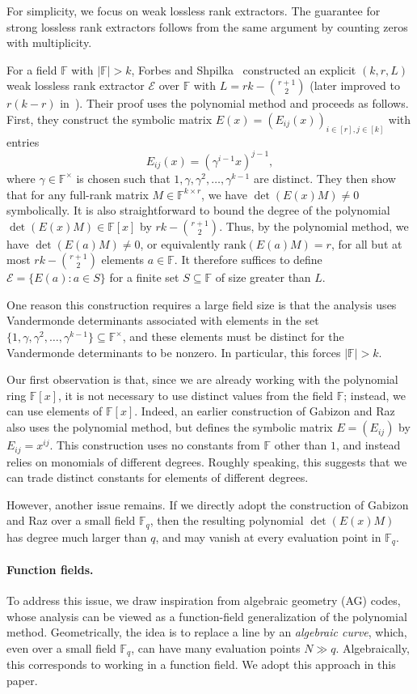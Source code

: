 \documentclass[11pt]{article}
\newcommand{\rank}{\mathrm{rank}}
\newcommand{\F}{\mathbb{F}}
\begin{document}
For simplicity, we focus on weak lossless rank extractors. The guarantee for strong lossless rank extractors follows from the same argument by counting zeros with multiplicity.

For a field $\F$ with $|\F|>k$, Forbes and Shpilka~\cite{FS12} constructed an explicit $(k,r,L)$ weak lossless rank extractor $\mathcal{E}$ over $\F$ with $L=rk-\binom{r+1}{2}$ (later improved to $r(k-r)$ in~\cite{FSS14,For14}). Their proof uses the polynomial method and proceeds as follows. First, they construct the symbolic matrix $E(x)=(E_{ij}(x))_{i\in [r], j\in [k]}$ with entries
\[
E_{ij}(x)=(\gamma^{i-1}x)^{j-1},
\]
where $\gamma\in\F^\times$ is chosen such that $1,\gamma,\gamma^2,\dots,\gamma^{k-1}$ are distinct. They then show that for any full-rank matrix $M\in \F^{k\times r}$, we have $\det(E(x)M)\neq 0$ symbolically. It is also straightforward to bound the degree of the polynomial $\det(E(x)M)\in\F[x]$ by $rk-\binom{r+1}{2}$. Thus, by the polynomial method, we have $\det(E(a)M)\neq 0$, or equivalently $\rank(E(a)M)=r$, for all but at most $rk-\binom{r+1}{2}$ elements $a\in\F$. It therefore suffices to define $\mathcal{E}=\{E(a): a\in S\}$ for a finite set $S\subseteq \F$ of size greater than $L$.

One reason this construction requires a large field size is that the analysis uses Vandermonde determinants associated with elements in the set $\{1,\gamma,\gamma^2,\dots,\gamma^{k-1}\}\subseteq\F^\times$, and these elements must be distinct for the Vandermonde determinants to be nonzero. In particular, this forces $|\F|>k$.

Our first observation is that, since we are already working with the polynomial ring $\F[x]$, it is not necessary to use distinct values from the field $\F$; instead, we can use elements of $\F[x]$. Indeed, an earlier construction of Gabizon and Raz~\cite{GR08} also uses the polynomial method, but defines the symbolic matrix $E=(E_{ij})$ by $E_{ij}=x^{ij}$. This construction uses no constants from $\F$ other than $1$, and instead relies on monomials of different degrees. Roughly speaking, this suggests that we can trade distinct constants for elements of different degrees.

However, another issue remains. If we directly adopt the construction of Gabizon and Raz over a small field $\F_q$, then the resulting polynomial $\det(E(x)M)$ has degree much larger than $q$, and may vanish at every evaluation point in $\F_q$.

\paragraph{Function fields.} 
To address this issue, we draw inspiration from algebraic geometry (AG) codes, whose analysis can be viewed as a function-field generalization of the polynomial method. Geometrically, the idea is to replace a line by an \emph{algebraic curve}, which, even over a small field $\F_q$, can have many evaluation points $N\gg q$. Algebraically, this corresponds to working in a function field. We adopt this approach in this paper.
\end{document}
